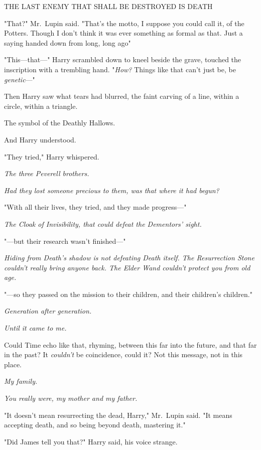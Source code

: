 \begin{center}
THE LAST ENEMY THAT SHALL BE DESTROYED IS DEATH
\end{center}

"That?" Mr.~Lupin said. "That's the{\el} motto, I suppose you could call it,
of the Potters. Though I don't think it was ever something as formal as that.
Just a saying handed down from long, long ago{\el}"

"This---that\mbox{---}" Harry scrambled down to kneel beside the grave, touched the
inscription with a trembling hand. "\emph{How?} Things like that can't just be,
be \emph{genetic}\mbox{---}"

Then Harry saw what tears had blurred, the faint carving of a line, within a
circle, within a triangle.

The symbol of the Deathly Hallows.

And Harry understood.

"They tried," Harry whispered.

\emph{The three Peverell brothers.}

\emph{Had they lost someone precious to them, was that where it had begun?}

"With all their lives, they tried, and they made progress\mbox{---}"

\emph{The Cloak of Invisibility, that could defeat the Dementors' sight.}

"---but their research wasn't finished\mbox{---}"

\emph{Hiding from Death's shadow is not defeating Death itself. The
Resurrection Stone couldn't really bring anyone back. The Elder Wand couldn't
protect you from old age.}

"---so they passed on the mission to their children, and their children's
children."

\emph{Generation after generation.}

\emph{Until it came to me.}

Could Time echo like that, rhyming, between this far into the future, and that
far in the past? It \emph{couldn't} be coincidence, could it? Not this message,
not in this place.

\emph{My family.}

\emph{You really were, my mother and my father.}

"It doesn't mean resurrecting the dead, Harry," Mr.~Lupin said. "It means
accepting death, and so being beyond death, mastering it."

"Did James tell you that?" Harry said, his voice strange.

